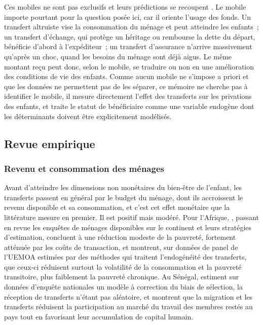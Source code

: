 Ces mobiles ne sont pas exclusifs et leurs prédictions se recoupent
\parencite{rapport2006}. Le mobile importe pourtant pour la question posée
ici, car il oriente l'usage des fonds. Un transfert altruiste vise la
consommation du ménage et peut atteindre les enfants~; un transfert
d'échange, qui protège un héritage ou rembourse la dette du départ,
bénéficie d'abord à l'expéditeur~; un transfert d'assurance n'arrive
massivement qu'après un choc, quand les besoins du ménage sont déjà
aigus. Le même montant reçu peut donc, selon le mobile, se traduire ou
non en une amélioration des conditions de vie des enfants. Comme aucun
mobile ne s'impose a priori et que les données ne permettent pas de les
séparer, ce mémoire ne cherche pas à identifier le mobile, il mesure
directement l'effet des transferts sur les privations des enfants, et
traite le statut de bénéficiaire comme une variable endogène dont les
déterminants doivent être explicitement modélisés.

\subsection{Revue empirique}

\subsubsection{Revenu et consommation des ménages}

Avant d'atteindre les dimensions non monétaires du bien-être de l'enfant,
les transferts passent en général par le budget du ménage, dont ils accroissent le revenu
disponible et sa consommation, et c'est cet effet monétaire que la
littérature mesure en premier. Il est positif mais modéré. Pour l'Afrique,
\textcite{azam2006}, passant en revue les enquêtes de ménages disponibles
sur le continent et leurs stratégies d'estimation, concluent à une réduction
modeste de la pauvreté, fortement atténuée par les coûts de transaction, et
\textcite{combes2011} montrent, sur données de panel de l'UEMOA estimées
par des méthodes qui traitent l'endogénéité des transferts, que ceux-ci
réduisent surtout la volatilité de la consommation et la pauvreté
transitoire, plus faiblement la pauvreté chronique. Au Sénégal,
\textcite{ndiaye2016} estiment sur données d'enquête nationales un modèle à
correction du biais de sélection, la réception de transferts n'étant pas
aléatoire, et montrent que la migration et les transferts réduisent la
participation au marché du travail des membres restés au pays tout en
favorisant leur accumulation de capital humain.

